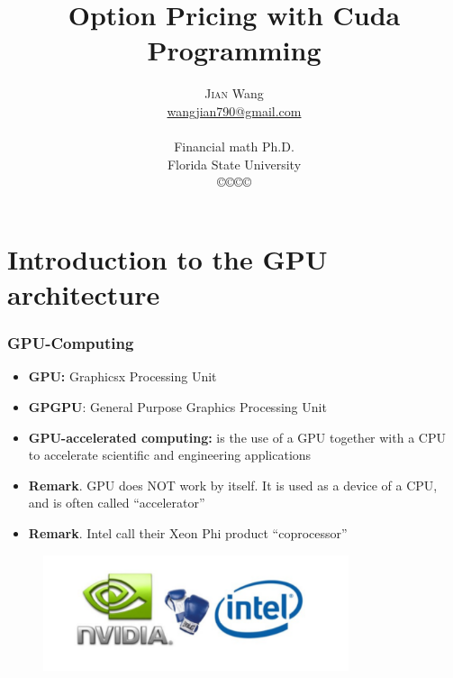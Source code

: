 \documentclass[xcolor={x11names,svgnames,dvipsnames}]{beamer}
\author[\textsc{Jian} Wang]{\textsc{Jian} Wang\\[1ex]%
{\small\url{wangjian790@gmail.com}\\[-.5ex]\url{}}\\
{\small{Financial math Ph.D.}}\\
{\small{Florida State University}}\\
[0.8ex]\copyright\copyright\copyright\copyright} %
\title{Option Pricing with Cuda Programming}
\date[\textsc{PPT} 2018]{}%
\begin{document}
\begin{frame}
\maketitle
\end{frame}



\section{Introduction to the GPU architecture}
\begin{frame}
\frametitle{GPU-Computing}
\begin{itemize}
 \item \textbf{GPU:} Graphicsx Processing Unit
\item \textbf{GPGPU}: General Purpose Graphics Processing Unit
\item \textbf{GPU-accelerated computing:} is the use of a GPU together with a CPU to accelerate scientific and engineering applications
\item \textbf{Remark}. GPU does NOT work by itself. It is used as a device of a CPU, and is often called “accelerator”
\item \textbf{Remark}. Intel call their Xeon Phi product “coprocessor”
\end{itemize}
 \begin{figure}
     \includegraphics[width=0.8\textwidth, height=0.4\textheight]{intel.png}
\end{figure}
\end{frame}
\end{document}
